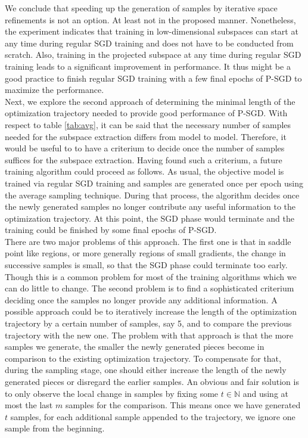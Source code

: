 \documentclass[11pt, a4paper]{article}
\newcommand{\N}{\mathbb{N}}
\begin{document}
We conclude that speeding up the generation of samples by iterative space refinements is not an option. At least not in the proposed manner. Nonetheless, the experiment indicates that training in low-dimensional subspaces can start at any time during regular SGD training and does not have to be conducted from scratch. Also, training in the projected subspace at any time during regular SGD training leads to a significant improvement in performance. It thus might be a good practice to finish regular SGD training with a few final epochs of P-SGD to maximize the performance. \\

Next, we explore the second approach of determining the minimal length of the optimization trajectory needed to provide good performance of P-SGD. With respect to table \ref{tab:avg}, it can be said that the necessary number of samples needed for the subspace extraction differs from model to model. Therefore, it would be useful to to have a criterium to decide once the number of samples suffices for the subspace extraction. Having found such a criterium, a future training algorithm could proceed as follows. As usual, the objective model is trained via regular SGD training and samples are generated once per epoch using the average sampling technique. During that process, the algorithm decides once the newly generated samples no longer contribute any useful information to the optimization trajectory. At this point, the SGD phase would terminate and the training could be finished by some final epochs of P-SGD. \\

There are two major problems of this approach. The first one is that in saddle point like regions, or more generally regions of small gradients, the change in successive samples is small, so that the SGD phase could terminate too early. Though this is a common problem for most of the training algorithms which we can do little to change. The second problem is to find a sophisticated criterium deciding once the samples no longer provide any additional information. A possible approach could be to iteratively increase the length of the optimization trajectory by a certain number of samples, say 5, and to compare the previous trajectory with the new one. The problem with that approach is that the more samples we generate, the smaller the newly generated pieces become in comparison to the existing optimization trajectory. To compensate for that, during the sampling stage, one should either increase the length of the newly generated pieces or disregard the earlier samples. An obvious and fair solution is to only observe the local change in samples by fixing some $t \in \N$ and using at most the last $m$ samples for the comparison. This means once we have generated $t$ samples, for each additional sample appended to the trajectory, we ignore one sample from the beginning. \\
\end{document}

